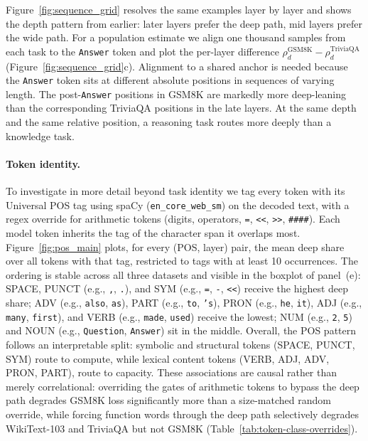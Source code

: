 \documentclass[11pt]{article}
\newcommand{\rev}[1]{{\color{red}#1}}
\begin{document}
Figure~\ref{fig:sequence_grid} resolves the same examples layer by layer and shows the depth pattern from earlier: later layers prefer the deep path, mid layers prefer the wide path. For a population estimate we align one thousand samples from each task to the \texttt{Answer} token and plot the per-layer difference $\rho_d^{\text{GSM8K}} - \rho_d^{\text{TriviaQA}}$ (Figure~\ref{fig:sequence_grid}c). Alignment to a shared anchor is needed because the \texttt{Answer} token sits at different absolute positions in sequences of varying length. The post-\texttt{Answer} positions in GSM8K are markedly more deep-leaning than the corresponding TriviaQA positions in the late layers. At the same depth and the same relative position, a reasoning task routes more deeply than a knowledge task.

\paragraph{Token identity.}
To investigate in more detail beyond task identity we tag every token with its Universal POS tag \citep{petrov2012universal, nivre2016ud} using spaCy \citep{honnibal2020spacy} (\texttt{en\_core\_web\_sm}) on the decoded text, with a regex override for arithmetic tokens (digits, operators, \texttt{=}, \texttt{<<}, \texttt{>>}, \texttt{\#\#\#\#}). Each model token inherits the tag of the character span it overlaps most. Figure~\ref{fig:pos_main} plots, for every (POS, layer) pair, the mean deep share over all tokens with that tag, restricted to tags with at least 10 occurrences. The ordering is stable across all three datasets and visible in the boxplot of panel~(e): SPACE, PUNCT (e.g., \texttt{,}, \texttt{.}), and SYM (e.g., \texttt{=}, \texttt{-}, \texttt{<<}) receive the highest deep share; ADV (e.g., \texttt{also}, \texttt{as}), PART (e.g., \texttt{to}, \texttt{'s}), PRON (e.g., \texttt{he}, \texttt{it}), ADJ (e.g., \texttt{many}, \texttt{first}), and VERB (e.g., \texttt{made}, \texttt{used}) receive the lowest; NUM (e.g., \texttt{2}, \texttt{5}) and NOUN (e.g., \texttt{Question}, \texttt{Answer}) sit in the middle. Overall, the POS pattern follows an interpretable split: symbolic and structural tokens (SPACE, PUNCT, SYM) route to compute, while lexical content tokens (VERB, ADJ, ADV, PRON, PART), route to capacity. \rev{These associations are causal rather than merely correlational: overriding the gates of arithmetic tokens to bypass the deep path degrades GSM8K loss significantly more than a size-matched random override, while forcing function words through the deep path selectively degrades WikiText-103 and TriviaQA but not GSM8K (Table~\ref{tab:token-class-overrides}).}
\end{document}
